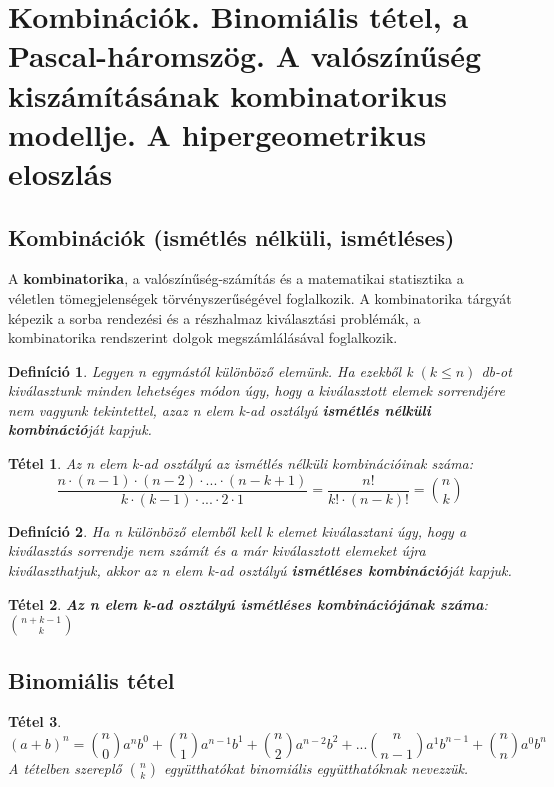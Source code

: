 \documentclass[12pt,a4paper]{article}
\newtheorem{theorem}{Tétel} [section]
\newtheorem{definition}{Definíció} [section]
\begin{document}
\section{Kombinációk. Binomiális tétel, a Pascal-háromszög. A valószínűség kiszámításának kombinatorikus modellje. A hipergeometrikus eloszlás}
\subsection{Kombinációk (ismétlés nélküli, ismétléses)}
A \textbf{kombinatorika}, a valószínűség-számítás és a matematikai statisztika a véletlen tömegjelenségek törvényszerűségével foglalkozik. A kombinatorika tárgyát képezik a sorba rendezési és a részhalmaz kiválasztási problémák, a kombinatorika rendszerint dolgok megszámlálásával foglalkozik.
\begin{definition}
Legyen n egymástól különböző elemünk. Ha ezekből k $(k \leq n)$ db-ot kiválasztunk minden lehetséges módon úgy, hogy a kiválasztott elemek sorrendjére nem vagyunk tekintettel, azaz n elem k-ad osztályú \textbf{ismétlés nélküli kombináció}ját kapjuk.
\end{definition}
\begin{theorem}
Az n elem k-ad osztályú az ismétlés nélküli kombinációinak száma:
$$\dfrac{n\cdot (n-1) \cdot (n-2) \cdot ... \cdot (n-k+1)}{k\cdot (k-1)\cdot ... \cdot 2\cdot 1}=\dfrac{n!}{k!\cdot (n-k)!}=\binom{n}{k}$$
\end{theorem}
\begin{definition}
 Ha n különböző elemből kell k elemet kiválasztani úgy, hogy a kiválasztás sorrendje nem számít és a már kiválasztott elemeket újra kiválaszthatjuk, akkor az n elem k-ad osztályú \textbf{ismétléses kombináció}ját kapjuk.
\end{definition}
\begin{theorem}
\textbf{Az n elem k-ad osztályú ismétléses kombinációjának száma}: $\displaystyle\binom{n+k-1}{k}$
\end{theorem}
\subsection{Binomiális tétel}
\begin{theorem}
\[(a+b)^n=\binom{n}{0}a^{n}b^{0}+\binom{n}{1}a^{n-1}b^{1}+\binom{n}{2}a^{n-2}b^{2}+...\binom{n}{n-1}a^{1}b^{n-1}+\binom{n}{n}a^{0}b^{n}\]
A tételben szereplő $\displaystyle\binom{n}{k}$ együtthatókat binomiális együtthatóknak nevezzük.
\end{theorem}
\end{document}
